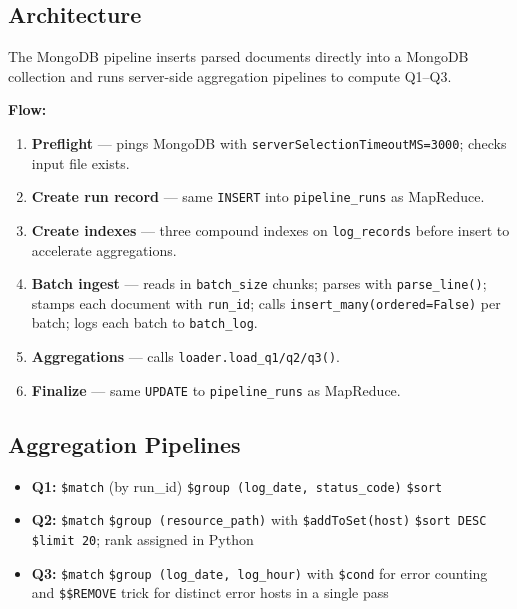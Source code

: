 \documentclass[12pt,a4paper]{article}
\begin{document}
\subsection{Architecture}

The MongoDB pipeline inserts parsed documents directly into a MongoDB collection and runs
server-side aggregation pipelines to compute Q1--Q3.

\textbf{Flow:}
\begin{enumerate}
  \item \textbf{Preflight} --- pings MongoDB with \texttt{serverSelectionTimeoutMS=3000};
        checks input file exists.
  \item \textbf{Create run record} --- same \texttt{INSERT} into \texttt{pipeline\_runs} as
        MapReduce.
  \item \textbf{Create indexes} --- three compound indexes on \texttt{log\_records} before
        insert to accelerate aggregations.
  \item \textbf{Batch ingest} --- reads in \texttt{batch\_size} chunks; parses with
        \texttt{parse\_line()}; stamps each document with \texttt{run\_id}; calls
        \texttt{insert\_many(ordered=False)} per batch; logs each batch to \texttt{batch\_log}.
  \item \textbf{Aggregations} --- calls \texttt{loader.load\_q1/q2/q3()}.
  \item \textbf{Finalize} --- same \texttt{UPDATE} to \texttt{pipeline\_runs} as MapReduce.
\end{enumerate}

\subsection{Aggregation Pipelines}

\begin{itemize}
  \item \textbf{Q1:} \texttt{\$match} (by run\_id) \textrightarrow{}
        \texttt{\$group (log\_date, status\_code)} \textrightarrow{} \texttt{\$sort}
  \item \textbf{Q2:} \texttt{\$match} \textrightarrow{} \texttt{\$group (resource\_path)}
        with \texttt{\$addToSet(host)} \textrightarrow{} \texttt{\$sort DESC} \textrightarrow{}
        \texttt{\$limit 20}; rank assigned in Python
  \item \textbf{Q3:} \texttt{\$match} \textrightarrow{} \texttt{\$group (log\_date, log\_hour)}
        with \texttt{\$cond} for error counting and \texttt{\$\$REMOVE} trick for distinct
        error hosts in a single pass
\end{itemize}
\end{document}
